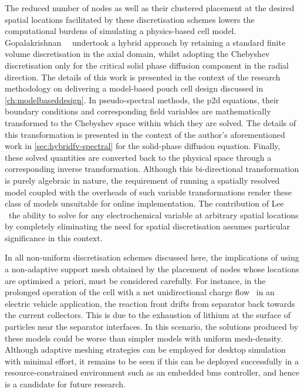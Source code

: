 The  reduced  number   of  nodes  as  well  as  their   clustered  placement  at
the  desired  spatial  locations  facilitated by  these  discretisation  schemes
lowers  the computational  burdens  of simulating  a  physics-based cell  model.
Gopalakrishnan~\etal{}~\cite{Gopalakrishnan2018} undertook a  hybrid approach by
retaining a  standard finite volume  discretisation in the axial  domain, whilst
adopting  the  Chebyshev  discretisation  only  for  the  critical  solid  phase
diffusion  component in  the  radial  direction. The  details  of  this work  is
presented in the context of the research methodology on delivering a model-based
pouch cell  design discussed  in \cref{ch:modelbaseddesign}.  In pseudo-spectral
methods, the  \gls{p2d} equations,  their boundary conditions  and corresponding
field variables  are mathematically  transformed to  the Chebyshev  space within
which they  are solved. The details  of this transformation is  presented in the
context  of the  author's  aforementioned  work in  \cref{sec:hybridfv-spectral}
for  the  solid-phase  diffusion  equation.  Finally,  these  solved  quantities
are  converted  back to  the  physical  space  through a  corresponding  inverse
transformation.   Although   this   bi-directional  transformation   is   purely
algebraic  in nature,  the requirement  of  running a  spatially resolved  model
coupled  with  the  overheads  of such  variable  transformations  render  these
class  of   models  unsuitable  for  online   implementation.  The  contribution
of   Lee~\etal~\cite{Lee2012a,Lee2012}  \ie~the   ability  to   solve  for   any
electrochemical   variable  at   arbitrary  spatial   locations  by   completely
eliminating the need for  spatial discretisation assumes particular significance
in this context.


In all  non-uniform discretisation schemes  discussed here, the  implications of
using  a non-adaptive  support mesh  obtained by  the placement  of nodes  whose
locations are optimised a~priori, must be considered carefully. For instance, in
the prolonged operation of the cell with a net unidirectional charge flow \eg~in
an electric vehicle  application, the reaction front drifts  from separator back
towards the current collectors. This is due  to the exhaustion of lithium at the
surface  of particles  near  the  separator interfaces.  In  this scenario,  the
solutions  produced by  these models  could be  worse than  simpler models  with
uniform mesh-density. Although  adaptive meshing strategies can  be employed for
desktop simulation  with minimal effort,  it remains to be  seen if this  can be
deployed successfully in a resource-constrained  environment such as an embedded
\gls{bms} controller, and hence is  a candidate for future research.


